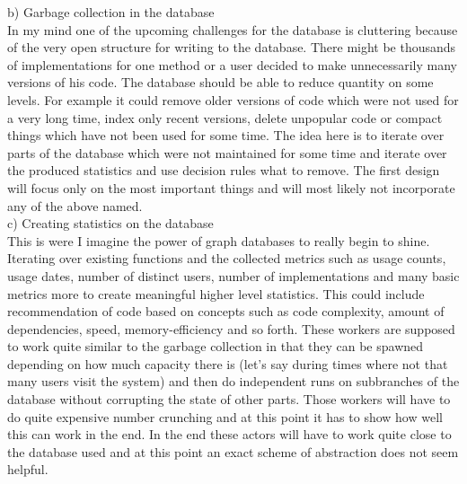 \documentclass[11p]{scrartcl}
\begin{document}
b) Garbage collection in the database\\
In my mind one of the upcoming challenges for the database is cluttering because of the very open structure for writing to the database.
There might be thousands of implementations for one method or a user decided to make unnecessarily many versions of his code.
The database should be able to reduce quantity on some levels. For example it could remove older versions of code which were not used for a very long time, index only recent versions, delete unpopular code or compact things which have not been used for some time.
The idea here is to iterate over parts of the database which were not maintained for some time and iterate over the produced statistics and use decision rules what to remove. The first design will focus only on the most important things and will most likely not incorporate any of the above named.\\

c) Creating statistics on the database\\
This is were I imagine the power of graph databases to really begin to shine. Iterating over existing functions and the collected metrics such as usage counts, usage dates, number of distinct users, number of implementations and many basic metrics more to create meaningful higher level statistics. This could include recommendation of code based on concepts such as code complexity, amount of dependencies, speed, memory-efficiency and so forth. These workers are supposed to work quite similar to the garbage collection in that they can be spawned depending on how much capacity there is (let's say during times where not that many users visit the system) and then do independent runs on subbranches of the database without corrupting the state of other parts. Those workers will have to do quite expensive number crunching  and at this point it has to show how well this can work in the end. In the end these actors will have to work quite close to the database used and at this point an exact scheme of abstraction does not seem helpful.\\
\end{document}
